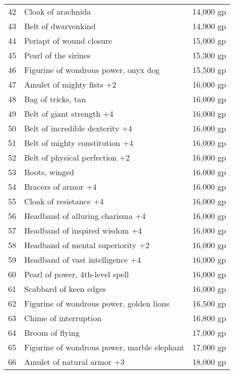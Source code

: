 \begin{xtabular}{lll}
42  & Cloak of arachnida                          & 14,000 gp    \\
43  & Belt of dwarvenkind                         & 14,900 gp    \\
44  & Periapt of wound closure                    & 15,000 gp    \\
45  & Pearl of the sirines                        & 15,300 gp    \\
46  & Figurine of wondrous power, onyx dog        & 15,500 gp    \\
47  & Amulet of mighty fists +2                   & 16,000 gp    \\
48  & Bag of tricks, tan                          & 16,000 gp    \\
49  & Belt of giant strength +4                   & 16,000 gp    \\
50  & Belt of incredible dexterity +4             & 16,000 gp    \\
51  & Belt of mighty constitution +4              & 16,000 gp    \\
52  & Belt of physical perfection +2              & 16,000 gp    \\
53  & Boots, winged                               & 16,000 gp    \\
54  & Bracers of armor +4                         & 16,000 gp    \\
55  & Cloak of resistance +4                      & 16,000 gp    \\
56  & Headband of alluring charisma +4            & 16,000 gp    \\
57  & Headband of inspired wisdom +4              & 16,000 gp    \\
58  & Headband of mental superiority +2           & 16,000 gp    \\
59  & Headband of vast intelligence +4            & 16,000 gp    \\
60  & Pearl of power, 4th-level spell             & 16,000 gp    \\
61  & Scabbard of keen edges                      & 16,000 gp    \\
62  & Figurine of wondrous power, golden lions    & 16,500 gp    \\
63  & Chime of interruption                       & 16,800 gp    \\
64  & Broom of flying                             & 17,000 gp    \\
65  & Figurine of wondrous power, marble elephant & 17,000 gp    \\
66  & Amulet of natural armor +3                  & 18,000 gp    \\

\end{xtabular}
